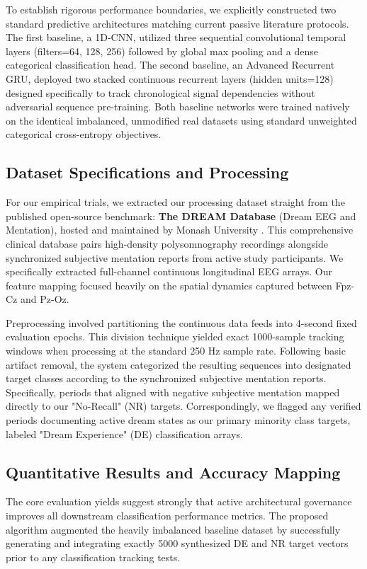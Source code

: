 \documentclass[journal,10pt,twocolumn]{IEEEtran}
\begin{document}
To establish rigorous performance boundaries, we explicitly constructed two standard predictive architectures matching current passive literature protocols. The first baseline, a 1D-CNN, utilized three sequential convolutional temporal layers (filters=64, 128, 256) followed by global max pooling and a dense categorical classification head. The second baseline, an Advanced Recurrent GRU, deployed two stacked continuous recurrent layers (hidden units=128) designed specifically to track chronological signal dependencies without adversarial sequence pre-training. Both baseline networks were trained natively on the identical imbalanced, unmodified real datasets using standard unweighted categorical cross-entropy objectives.

\subsection{Dataset Specifications and Processing}
For our empirical trials, we extracted our processing dataset straight from the published open-source benchmark: \textbf{The DREAM Database} (Dream EEG and Mentation), hosted and maintained by Monash University \cite{wong2023dream}. This comprehensive clinical database pairs high-density polysomnography recordings alongside synchronized subjective mentation reports from active study participants. We specifically extracted full-channel continuous longitudinal EEG arrays. Our feature mapping focused heavily on the spatial dynamics captured between Fpz-Cz and Pz-Oz. 

Preprocessing involved partitioning the continuous data feeds into 4-second fixed evaluation epochs. This division technique yielded exact 1000-sample tracking windows when processing at the standard 250 Hz sample rate. Following basic artifact removal, the system categorized the resulting sequences into designated target classes according to the synchronized subjective mentation reports. Specifically, periods that aligned with negative subjective mentation mapped directly to our "No-Recall" (NR) targets. Correspondingly, we flagged any verified periods documenting active dream states as our primary minority class targets, labeled "Dream Experience" (DE) classification arrays.

\subsection{Quantitative Results and Accuracy Mapping}
The core evaluation yields suggest strongly that active architectural governance improves all downstream classification performance metrics. The proposed algorithm augmented the heavily imbalanced baseline dataset by successfully generating and integrating exactly 5000 synthesized DE and NR target vectors prior to any classification tracking tests.
\end{document}

